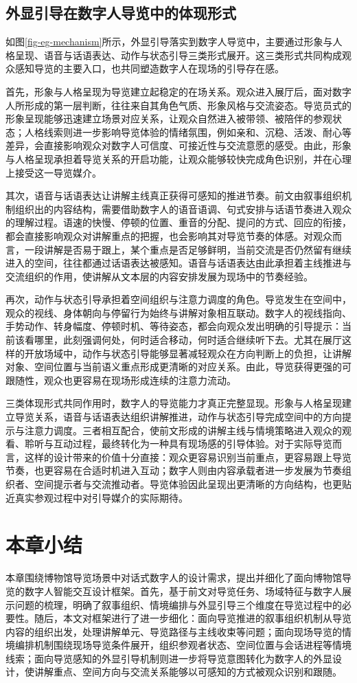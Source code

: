 \subsection{外显引导在数字人导览中的体现形式}
如图\ref{fig-eg-mechanism}所示，外显引导落实到数字人导览中，主要通过形象与人格呈现、语音与话语表达、动作与状态引导三类形式展开。这三类形式共同构成观众感知导览的主要入口，也共同塑造数字人在现场的引导存在感。

首先，形象与人格呈现为导览建立起稳定的在场关系。观众进入展厅后，面对数字人所形成的第一层判断，往往来自其角色气质、形象风格与交流姿态。导览员式的形象呈现能够迅速建立场景对应关系，让观众自然进入被带领、被陪伴的参观状态；人格线索则进一步影响导览体验的情绪氛围，例如亲和、沉稳、活泼、耐心等差异，会直接影响观众对数字人可信度、可接近性与交流意愿的感受。由此，形象与人格呈现承担着导览关系的开启功能，让观众能够较快完成角色识别，并在心理上接受这一导览媒介。

其次，语音与话语表达让讲解主线真正获得可感知的推进节奏。前文由叙事组织机制组织出的内容结构，需要借助数字人的语音语调、句式安排与话语节奏进入观众的理解过程。语速的快慢、停顿的位置、重音的分配、提问的方式、回应的衔接，都会直接影响观众对讲解重点的把握，也会影响其对导览节奏的体感。对观众而言，一段讲解是否易于跟上，某个重点是否足够鲜明，当前交流是否仍然留有继续进入的空间，往往都通过话语表达被感知。语音与话语表达由此承担着主线推进与交流组织的作用，使讲解从文本层的内容安排发展为现场中的节奏经验。

再次，动作与状态引导承担着空间组织与注意力调度的角色。导览发生在空间中，观众的视线、身体朝向与停留行为始终与讲解对象相互联动。数字人的视线指向、手势动作、转身幅度、停顿时机、等待姿态，都会向观众发出明确的引导提示：当前该看哪里，此刻强调何处，何时适合移动，何时适合继续听下去。尤其在展厅这样的开放场域中，动作与状态引导能够显著减轻观众在方向判断上的负担，让讲解对象、空间位置与当前语义重点形成更清晰的对应关系。由此，导览获得更强的可跟随性，观众也更容易在现场形成连续的注意力流动。

三类体现形式共同作用时，数字人的导览能力才真正完整显现。形象与人格呈现建立导览关系，语音与话语表达组织讲解推进，动作与状态引导完成空间中的方向提示与注意力调度。三者相互配合，使前文形成的讲解主线与情境策略进入观众的观看、聆听与互动过程，最终转化为一种具有现场感的引导体验。对于实际导览而言，这样的设计带来的价值十分直接：观众更容易识别当前重点，更容易跟上导览节奏，也更容易在合适时机进入互动；数字人则由内容承载者进一步发展为节奏组织者、空间提示者与交流推动者。导览体验因此呈现出更清晰的方向结构，也更贴近真实参观过程中对引导媒介的实际期待。


\section{本章小结}
本章围绕博物馆导览场景中对话式数字人的设计需求，提出并细化了面向博物馆导览的数字人智能交互设计框架。首先，基于前文对导览任务、场域特征与数字人展示问题的梳理，明确了叙事组织、情境编排与外显引导三个维度在导览过程中的必要性。随后，本文对框架进行了进一步细化：面向导览推进的叙事组织机制从导览内容的组织出发，处理讲解单元、导览路径与主线收束等问题；面向现场导览的情境编排机制围绕现场导览条件展开，组织参观者状态、空间位置与会话进程等情境线索；面向导览感知的外显引导机制则进一步将导览意图转化为数字人的外显设计，使讲解重点、空间方向与交流关系能够以可感知的方式被观众识别和跟随。

